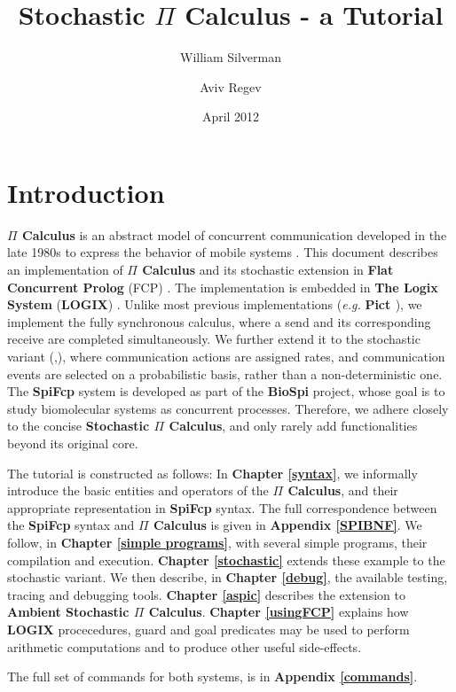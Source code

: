 \documentclass[twoside,10pt]{report}
\title{Stochastic $\Pi$ Calculus - a Tutorial}
\author{William Silverman \and Aviv Regev}
\date{April 2012}
\begin{document}
 
\maketitle

\tableofcontents

\chapter{Introduction}
{\bf $\Pi$ Calculus} is an abstract model of concurrent communication
developed in the late 1980s to express the behavior of mobile systems
\cite{Milner99}.  This document describes an implementation of
{\bf $\Pi$ Calculus} and its stochastic extension in {\bf Flat
Concurrent Prolog} (FCP) \cite{Shapiro87a}.  The implementation is
embedded in {\bf The Logix System} ({\bf LOGIX})
\cite{logix:user-man,logix:user-man-supp}. Unlike most previous
implementations ({\em e.g.} {\bf Pict \cite{PT99}}), we implement the fully
synchronous calculus, where a send and its corresponding receive
are completed simultaneously.  We further extend it to the stochastic
variant (\cite{Pri95},\cite{RPSS}), where communication actions are
assigned rates, and communication events are selected on a
probabilistic basis, rather than a non-deterministic one.  The {\bf SpiFcp}
system is developed as part of the {\bf BioSpi} project, whose goal is to
study biomolecular systems as concurrent processes. Therefore, we
adhere closely to the concise {\bf Stochastic $\Pi$ Calculus}, and only rarely
add functionalities beyond its original core.

The tutorial is constructed as follows: In {\bf Chapter \ref{syntax}}, we
informally introduce the basic entities and operators of the
{\bf $\Pi$ Calculus}, and their appropriate representation in {\bf SpiFcp}
syntax. The full correspondence between the {\bf SpiFcp} syntax and
{\bf $\Pi$ Calculus} is given in
{\bf Appendix \ref{SPIBNF}}.  We follow, in {\bf Chapter \ref{simple programs}}, with
several simple programs, their compilation and execution.
{\bf Chapter \ref{stochastic}} extends these example to the stochastic variant.  We
then describe, in {\bf Chapter \ref{debug}}, the available testing,
tracing and debugging tools.
{\bf Chapter \ref{aspic}} describes the extension to
{\bf Ambient Stochastic $\Pi$ Calculus}.
{\bf Chapter \ref{usingFCP}} explains how
{\bf LOGIX} procecedures, guard and goal predicates may be used to
perform arithmetic computations and to produce other useful side-effects.

The full set of commands for both systems, is in
{\bf Appendix \ref{commands}}.
\end{document}
